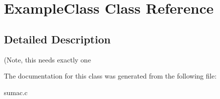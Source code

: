 \hypertarget{class_example_class}{\section{Example\+Class Class Reference}
\label{class_example_class}
}


\subsection{Detailed Description}
(Note, this needs exactly one 

The documentation for this class was generated from the following file\+:\begin{DoxyCompactItemize}
\item 
sumac.\+c\end{DoxyCompactItemize}
